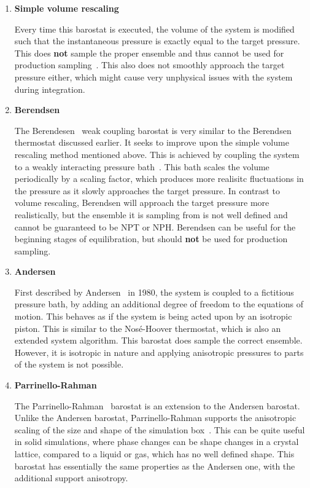 \documentclass[9pt,bestpractices]{livecoms}
\begin{document}
\begin{enumerate}[listparindent=\parindent]

    \item \textbf{Simple volume rescaling}

        Every time this barostat is executed, the volume of the system is modified such that the instantaneous pressure is exactly equal to the target pressure.
        This does \textbf{not} sample the proper ensemble and thus cannot be used for production sampling~\cite{ShellNotes}.
        This also does not smoothly approach the target pressure either, which might cause very unphysical issues with the system during integration.

    \item \textbf{Berendsen}

        The Berendesen~\cite{berendsen1984molecular} weak coupling barostat is very similar to the Berendsen thermostat discussed earlier.
        It seeks to improve upon the simple volume rescaling method mentioned above.
        This is achieved by coupling the system to a weakly interacting pressure bath~\cite{berendsen1984molecular}.
        This bath scales the volume periodically by a scaling factor, which produces more realisitc fluctuations in the pressure as it slowly approaches the target pressure.
        In contrast to volume rescaling, Berendsen will approach the target pressure more realistically, but the ensemble it is sampling from is not well defined and cannot be guaranteed to be NPT or NPH\@.
        Berendsen can be useful for the beginning stages of equilibration, but should \textbf{not} be used for production sampling.

    \item \textbf{Andersen}

        First described by Andersen~\cite{andersen1980molecular} in 1980, the system is coupled to a fictitious pressure bath, by adding an additional degree of freedom to the equations of motion.
        This behaves as if the system is being acted upon by an isotropic piston.
        This is similar to the Nos\'{e}-Hoover thermostat, which is also an extended system algorithm.
        This barostat does sample the correct ensemble. However, it is isotropic in nature and applying anisotropic pressures to parts of the system is not possible.

    \item \textbf{Parrinello-Rahman}
    
        The Parrinello-Rahman~\cite{Parrinello1981} barostat is an extension to the Andersen barostat.
        Unlike the Andersen barostat, Parrinello-Rahman supports the anisotropic scaling of the size and shape of the simulation box~\cite{Parrinello1981}.
        This can be quite useful in solid simulations, where phase changes can be shape changes in a crystal lattice, compared to a liquid or gas, which has no well defined shape.
        This barostat has essentially the same properties as the Andersen one, with the additional support anisotropy.
    

\end{enumerate}
\end{document}
